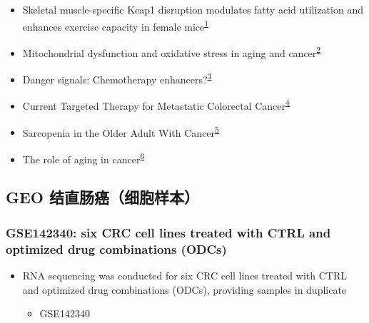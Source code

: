 \documentclass[
]{article}
\providecommand{\tightlist}{%
  \setlength{\itemsep}{0pt}\setlength{\parskip}{0pt}}
\begin{document}
\begin{itemize}
\tightlist
\item
  Skeletal muscle-specific Keap1 disruption modulates fatty acid utilization and enhances exercise capacity in female mice\textsuperscript{\protect\hyperlink{ref-SkeletalMuscleOnoki2021}{1}}
\item
  Mitochondrial dysfunction and oxidative stress in aging and cancer\textsuperscript{\protect\hyperlink{ref-MitochondrialDKudrya2016}{2}}
\item
  Danger signals: Chemotherapy enhancers?\textsuperscript{\protect\hyperlink{ref-DangerSignalsVargas2017}{3}}
\item
  Current Targeted Therapy for Metastatic Colorectal Cancer\textsuperscript{\protect\hyperlink{ref-CurrentTargeteOhishi2023}{4}}
\item
  Sarcopenia in the Older Adult With Cancer\textsuperscript{\protect\hyperlink{ref-SarcopeniaInTWillia2021}{5}}
\item
  The role of aging in cancer\textsuperscript{\protect\hyperlink{ref-TheRoleOfAgiHavas2022}{6}}
\end{itemize}

\hypertarget{geo-ux7ed3ux76f4ux80a0ux764cux7ec6ux80deux6837ux672c}{%
\subsection{GEO 结直肠癌（细胞样本）}\label{geo-ux7ed3ux76f4ux80a0ux764cux7ec6ux80deux6837ux672c}}

\hypertarget{gse142340-six-crc-cell-lines-treated-with-ctrl-and-optimized-drug-combinations-odcs}{%
\subsubsection{GSE142340: six CRC cell lines treated with CTRL and optimized drug combinations (ODCs)}\label{gse142340-six-crc-cell-lines-treated-with-ctrl-and-optimized-drug-combinations-odcs}}

\begin{itemize}
\tightlist
\item
  RNA sequencing was conducted for six CRC cell lines treated with CTRL and optimized drug combinations (ODCs), providing samples in duplicate

  \begin{itemize}
  \tightlist
  \item
    GSE142340
  \end{itemize}
\end{itemize}
\end{document}
